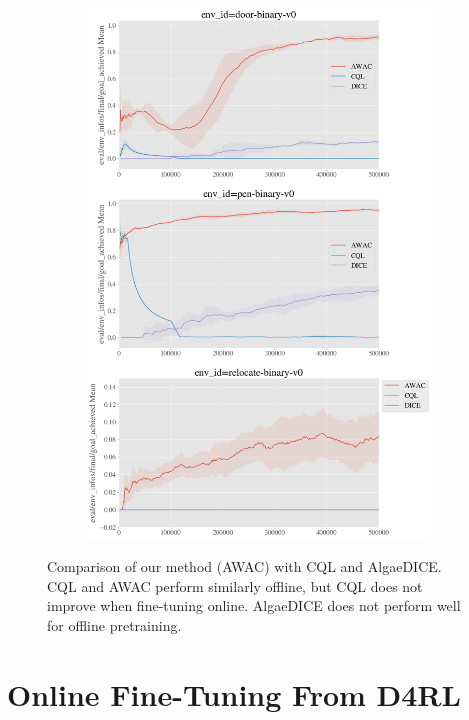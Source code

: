 \begin{figure}[H]
\begin{subfigure}[b]{0.49\textwidth}
    \end{subfigure}
    \begin{subfigure}[b]{0.49\textwidth}
        \center
        \includegraphics[width=\textwidth]{awac/figures/iclrrebuttal/d4rl_hand_comparisons.png}
    \end{subfigure}
    \caption{Comparison of our method (AWAC) with CQL and AlgaeDICE. CQL and AWAC perform similarly offline, but CQL does not improve when fine-tuning online. AlgaeDICE does not perform well for offline pretraining. }
    \label{fig:cql-dice}
\end{figure}


\section{Online Fine-Tuning From D4RL}

